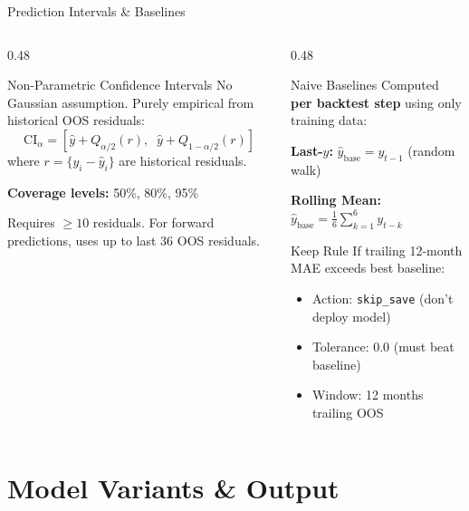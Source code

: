 \documentclass[aspectratio=169,10pt]{beamer}
\begin{document}
\begin{frame}{Prediction Intervals \& Baselines}
\begin{columns}[T]
\begin{column}{0.48\textwidth}
\begin{block}{Non-Parametric Confidence Intervals}
\footnotesize
No Gaussian assumption. Purely empirical from historical OOS residuals:
\[
\text{CI}_{\alpha} = \left[\hat{y} + Q_{\alpha/2}(r),\;\; \hat{y} + Q_{1-\alpha/2}(r)\right]
\]
where $r = \{y_i - \hat{y}_i\}$ are historical residuals.

\vspace{0.15cm}
\textbf{Coverage levels:} 50\%, 80\%, 95\%

\vspace{0.15cm}
Requires $\ge 10$ residuals. For forward predictions, uses up to last 36 OOS residuals.
\end{block}
\end{column}
\begin{column}{0.48\textwidth}
\begin{block}{Naive Baselines}
\footnotesize
Computed \textbf{per backtest step} using only training data:

\vspace{0.1cm}
\textbf{Last-$y$:} $\hat{y}_{\text{base}} = y_{t-1}$ (random walk)

\vspace{0.1cm}
\textbf{Rolling Mean:} $\hat{y}_{\text{base}} = \frac{1}{6}\sum_{k=1}^{6} y_{t-k}$
\end{block}

\begin{alertblock}{Keep Rule}
\footnotesize
If trailing 12-month MAE exceeds best baseline:
\begin{itemize}\scriptsize
  \item Action: \texttt{skip\_save} (don't deploy model)
  \item Tolerance: 0.0 (must beat baseline)
  \item Window: 12 months trailing OOS
\end{itemize}
\end{alertblock}
\end{column}
\end{columns}
\end{frame}

\section{Model Variants \& Output}
\end{document}
